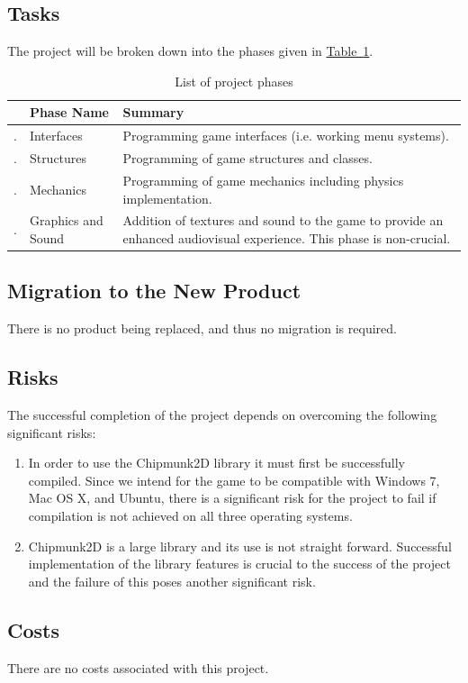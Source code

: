 \documentclass[12pt, titlepage]{article}
\newcounter{PhaseList}
\newcommand{\printPhase}{
    \stepcounter{PhaseList}
    \arabic{PhaseList}.
}
\begin{document}
\subsection{Tasks}
The project will be broken down into the phases given in \hyperref[tab:phases]{Table~\ref*{tab:phases}}.
\begin{table}[h]
\caption{List of project phases} \label{tab:phases}
\begin{tabularx}{\textwidth}{p{0.5cm}>{\raggedright}p{4.5cm}X}
\toprule & {\bf Phase Name} & {\bf Summary}\\
\midrule
\printPhase & Interfaces & Programming game interfaces (i.e. working menu systems).\\
\printPhase & Structures & Programming of game structures and classes.\\
\printPhase & Mechanics & Programming of game mechanics including physics implementation.\\
\printPhase & Graphics and Sound & Addition of textures and sound to the game to provide an enhanced audiovisual experience.  This phase is non-crucial. \\
\bottomrule
\end{tabularx}
\end{table}
\subsection{Migration to the New Product}
There is no product being replaced, and thus no migration is required.
\subsection{Risks}
The successful completion of the project depends on overcoming the following significant risks:
\begin{enumerate}
  \item In order to use the Chipmunk2D library it must first be successfully compiled.  Since we intend for the game to be compatible with Windows 7, Mac OS X, and Ubuntu, there is a significant risk for the project to fail if compilation is not achieved on all three operating systems.
  \item Chipmunk2D is a large library and its use is not straight forward.  Successful implementation of the library features is crucial to the success of the project and the failure of this poses another significant risk.
\end{enumerate}
\subsection{Costs}
There are no costs associated with this project.
\end{document}
